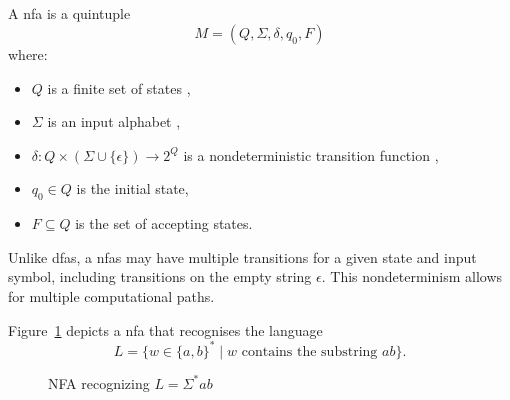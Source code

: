 \subsection{}
\label{subsec:nfa}
\begin{definition}
    A \gls{nfa} is a quintuple 
    \[
    M = (Q, \Sigma, \delta, q_0, F)
    \]
    where:
    \begin{itemize}
        \item \( Q \) is a finite set of states \cite{kozen1997automata},
        \item \( \Sigma \) is an input alphabet \cite{sudkamp2006languages},
        \item \( \delta: Q \times (\Sigma \cup \{\epsilon\}) \rightarrow 2^Q \) is a nondeterministic transition function \cite{hopcroft2006introduction},
        \item \( q_0 \in Q \) is the initial state,
        \item \( F \subseteq Q \) is the set of accepting states.
    \end{itemize}
\end{definition}

\begin{remark}
Unlike \glspl{dfa}, a \glspl{nfa} may have multiple transitions for a given state and input symbol, including transitions on the empty string \(\epsilon\). This nondeterminism allows for multiple computational paths.
\end{remark}

\begin{example}
Figure~\ref{fig:nfa-example} depicts a \gls{nfa} that recognises the language 
\[
L = \{ w \in \{a,b\}^* \mid w \text{ contains the substring } ab \}.
\]
\end{example}

\begin{figure}[ht]
    \centering  
    \caption{NFA recognizing \( L = \Sigma^*ab \)}
    \label{fig:nfa-example}
\end{figure}

